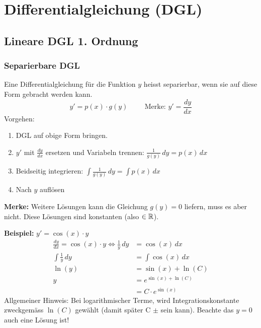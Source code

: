 \section{Differentialgleichung (DGL)}
\subsection{Lineare DGL 1. Ordnung}
\subsubsection{Separierbare DGL}
Eine Differentialgleichung für die Funktion $y$ heisst separierbar, wenn sie auf diese Form gebracht werden kann.
\[
	y' = p(x) \cdot g(y) \hspace{1cm} \text{Merke: $y' = \frac{dy}{dx}$}
\]
Vorgehen:
\begin{enumerate}
	\item DGL auf obige Form bringen.

	\item $y'$ mit $\frac{dy}{dx}$ ersetzen und Variabeln trennen: $\frac{1}{g(y)} \, dy = p(x) \, dx$

	\item Beidseitig integrieren: $\int \frac{1}{g(y)} \, dy = \int p(x) \, dx$

	\item Nach $y$ auflösen
\end{enumerate}
\textbf{Merke:} Weitere Lösungen kann die Gleichung $g(y) = 0$ liefern, muss es aber nicht. Diese Lösungen sind konstanten (also $\in \mathbb{R}$).

\textbf{Beispiel:} $y' = \cos(x) \cdot y$
\begin{align*}
	\frac{dy}{dx} = \cos(x) \cdot y \Leftrightarrow \frac{1}{y} \, dy &= \cos(x) \, dx\\
	\int \frac{1}{y} \, dy &= \int \cos(x) \, dx \\
	\ln(y) &= \sin(x) + \ln(C)\\
	y &= e^{\sin(x) + \ln(C)} \\
	 &= C \cdot e^{\sin(x)}
\end{align*}
{\small Allgemeiner Hinweis: Bei logarithmischer Terme, wird Integrationskonstante zweckgemäss $\ln(C)$ gewählt (damit später C $\pm$ sein kann). Beachte das $y = 0$ auch eine Lösung ist!}


